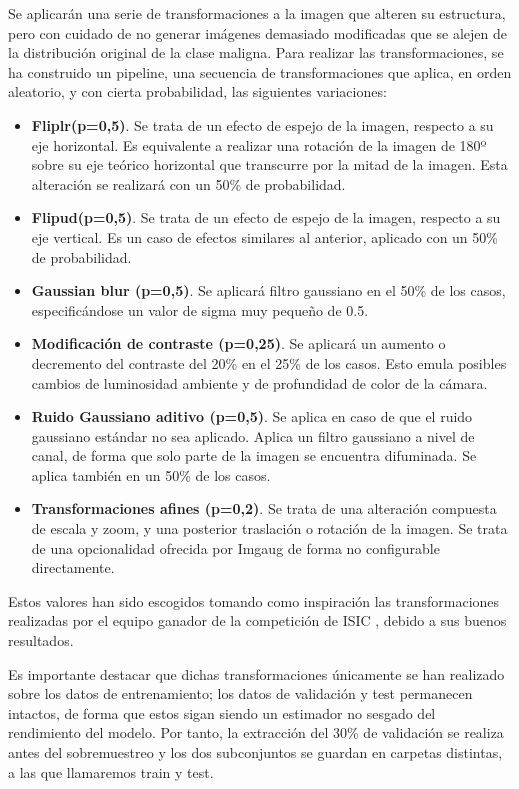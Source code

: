 Se aplicarán una serie de transformaciones a la imagen que alteren su estructura, pero con cuidado de no generar imágenes demasiado modificadas que se alejen de la distribución original de la clase maligna. Para realizar las transformaciones, se ha construido un pipeline, una secuencia de transformaciones que aplica, en orden aleatorio, y con cierta probabilidad, las siguientes variaciones:

\begin{itemize}
	\item \textbf{Fliplr(p=0,5)}. Se trata de un efecto de espejo de la imagen, respecto a su eje horizontal. Es equivalente a realizar una rotación de la imagen de 180º sobre su eje teórico horizontal que transcurre por la mitad de la imagen. Esta alteración se realizará con un 50\% de probabilidad.
	\item \textbf{Flipud(p=0,5)}. Se trata de un efecto de espejo de la imagen, respecto a su eje vertical. Es un caso de efectos similares al anterior, aplicado con un 50\% de probabilidad.
	\item \textbf{Gaussian blur (p=0,5)}. Se aplicará filtro gaussiano en el 50\% de los casos, especificándose un valor de sigma muy pequeño de 0.5.
	\item \textbf{Modificación de contraste  (p=0,25)}. Se aplicará un aumento o decremento del contraste del 20\% en el 25\% de los casos. Esto emula posibles cambios de luminosidad ambiente y de profundidad de color de la cámara.
	\item \textbf{Ruido Gaussiano aditivo  (p=0,5)}. Se aplica en caso de que el ruido gaussiano estándar no sea aplicado. Aplica un filtro gaussiano a nivel de canal, de forma que solo parte de la imagen se encuentra difuminada.  Se aplica también en un 50\% de los casos.
	\item \textbf{Transformaciones afines  (p=0,2)}. Se trata de una alteración compuesta de escala y zoom, y una posterior traslación o rotación de la imagen. Se trata de una opcionalidad ofrecida por Imgaug de forma no configurable directamente.
\end{itemize}

Estos valores han sido escogidos tomando como inspiración las transformaciones realizadas por el equipo ganador de la competición de ISIC \cite{1stISIC}, debido a sus buenos resultados.

Es importante destacar que dichas transformaciones únicamente se han realizado sobre los datos de entrenamiento; los datos de validación y test permanecen intactos, de forma que estos sigan siendo un estimador no sesgado del rendimiento del modelo. Por tanto, la extracción del 30\% de validación se realiza antes del sobremuestreo y los dos subconjuntos se guardan en carpetas distintas, a las que llamaremos train y test.

